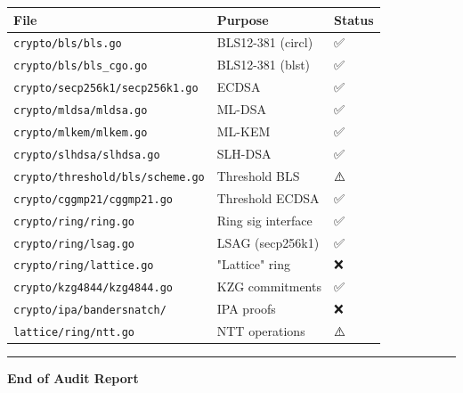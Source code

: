 \documentclass[
]{article}
\newcounter{none} %
\begin{document}
{\def\LTcaptype{none} %
\begin{longtable}[]{@{}lll@{}}
\toprule\noalign{}
File & Purpose & Status \\
\midrule\noalign{}
\endhead
\bottomrule\noalign{}
\endlastfoot
\texttt{crypto/bls/bls.go} & BLS12-381 (circl) & ✅ \\
\texttt{crypto/bls/bls\_cgo.go} & BLS12-381 (blst) & ✅ \\
\texttt{crypto/secp256k1/secp256k1.go} & ECDSA & ✅ \\
\texttt{crypto/mldsa/mldsa.go} & ML-DSA & ✅ \\
\texttt{crypto/mlkem/mlkem.go} & ML-KEM & ✅ \\
\texttt{crypto/slhdsa/slhdsa.go} & SLH-DSA & ✅ \\
\texttt{crypto/threshold/bls/scheme.go} & Threshold BLS & ⚠️ \\
\texttt{crypto/cggmp21/cggmp21.go} & Threshold ECDSA & ✅ \\
\texttt{crypto/ring/ring.go} & Ring sig interface & ✅ \\
\texttt{crypto/ring/lsag.go} & LSAG (secp256k1) & ✅ \\
\texttt{crypto/ring/lattice.go} & "Lattice" ring & ❌ \\
\texttt{crypto/kzg4844/kzg4844.go} & KZG commitments & ✅ \\
\texttt{crypto/ipa/bandersnatch/} & IPA proofs & ❌ \\
\texttt{lattice/ring/ntt.go} & NTT operations & ⚠️ \\
\end{longtable}
}

\begin{center}\rule{0.5\linewidth}{0.5pt}\end{center}

\textbf{End of Audit Report}
\end{document}
